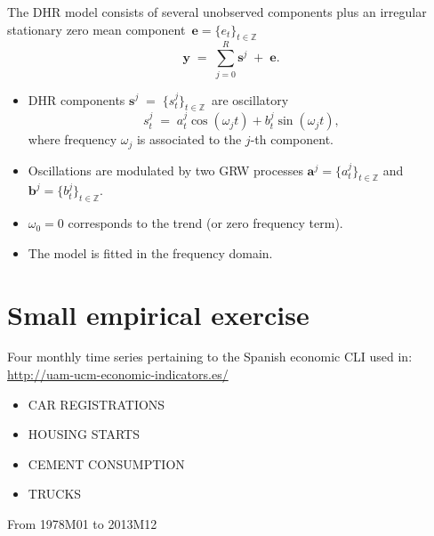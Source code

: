 \begin{slide}

  The {DHR} model consists of several unobserved components plus an
  irregular stationary zero mean component
  $\,{\boldsymbol{e}}=\{e_{t}\}_{t\in\mathbb{Z}}\,$
  \begin{equation}
    \boldsymbol{y}\;=\;\sum_{j=0}^{R}\boldsymbol{s}^{j}\;+\;\boldsymbol{e}.
  \end{equation}
  \begin{itemize}
  \item {DHR} components
    \;$\boldsymbol{s}^{j}\;=\;\{s_{t}^{j}\}_{t\in\mathbb{Z}}\,$\; are
    oscillatory
    \begin{equation}
      s_{t}^{j}\; =\; a_{t}^{j}\cos(\omega_{j}t)+b_{t}^{j}\sin(\omega_{j}t),
    \end{equation}
    where frequency $\omega_{j}$ is associated to the $j$-th component.
  \item Oscillations are modulated by two {GRW} processes 
    \;$\boldsymbol{a}^{j} = \{a^{j}_t\}_{t\in\mathbb{Z}}$\; and
    \;$\boldsymbol{b}^{j} = \{b^{j}_t\}_{t\in\mathbb{Z}}$.
  \item $\omega_{0}=0$ corresponds to the trend (or zero frequency
    term).
  \item The model is fitted in the frequency domain.
  \end{itemize}
\end{slide}

\section[Exercise]{Small empirical exercise}

\begin{slide}

  Four monthly time series pertaining to the Spanish economic CLI used
  in: \url{http://uam-ucm-economic-indicators.es/}
  \bigskip
  
  \begin{itemize}
  \item CAR REGISTRATIONS
  \item HOUSING STARTS
  \item CEMENT CONSUMPTION
  \item TRUCKS
  \end{itemize}
  \bigskip

  From 1978M01 to 2013M12
\end{slide}

